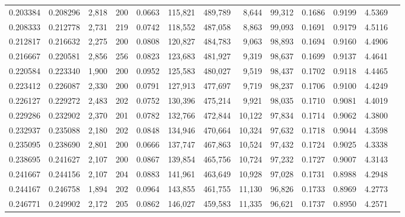 \begin{tabular}{rrrrrrrrrrrrr}
0.203384 & 0.208296 &  2,818 &   200 &                                     0.0663 & 115,821 & 489,789 &   8,644 &  99,312 & 0.1686 & 0.9199 & 4.5369 \\
0.208333 & 0.212778 &  2,731 &   219 &                                     0.0742 & 118,552 & 487,058 &   8,863 &  99,093 & 0.1691 & 0.9179 & 4.5116 \\
0.212817 & 0.216632 &  2,275 &   200 &                                     0.0808 & 120,827 & 484,783 &   9,063 &  98,893 & 0.1694 & 0.9160 & 4.4906 \\
0.216667 & 0.220581 &  2,856 &   256 &                                     0.0823 & 123,683 & 481,927 &   9,319 &  98,637 & 0.1699 & 0.9137 & 4.4641 \\
0.220584 & 0.223340 &  1,900 &   200 &                                     0.0952 & 125,583 & 480,027 &   9,519 &  98,437 & 0.1702 & 0.9118 & 4.4465 \\
0.223412 & 0.226087 &  2,330 &   200 &                                     0.0791 & 127,913 & 477,697 &   9,719 &  98,237 & 0.1706 & 0.9100 & 4.4249 \\
0.226127 & 0.229272 &  2,483 &   202 &                                     0.0752 & 130,396 & 475,214 &   9,921 &  98,035 & 0.1710 & 0.9081 & 4.4019 \\
0.229286 & 0.232902 &  2,370 &   201 &                                     0.0782 & 132,766 & 472,844 &  10,122 &  97,834 & 0.1714 & 0.9062 & 4.3800 \\
0.232937 & 0.235088 &  2,180 &   202 &                                     0.0848 & 134,946 & 470,664 &  10,324 &  97,632 & 0.1718 & 0.9044 & 4.3598 \\
0.235095 & 0.238690 &  2,801 &   200 &                                     0.0666 & 137,747 & 467,863 &  10,524 &  97,432 & 0.1724 & 0.9025 & 4.3338 \\
0.238695 & 0.241627 &  2,107 &   200 &                                     0.0867 & 139,854 & 465,756 &  10,724 &  97,232 & 0.1727 & 0.9007 & 4.3143 \\
0.241667 & 0.244156 &  2,107 &   204 &                                     0.0883 & 141,961 & 463,649 &  10,928 &  97,028 & 0.1731 & 0.8988 & 4.2948 \\
0.244167 & 0.246758 &  1,894 &   202 &                                     0.0964 & 143,855 & 461,755 &  11,130 &  96,826 & 0.1733 & 0.8969 & 4.2773 \\
0.246771 & 0.249902 &  2,172 &   205 &                                     0.0862 & 146,027 & 459,583 &  11,335 &  96,621 & 0.1737 & 0.8950 & 4.2571 \\

\end{tabular}
